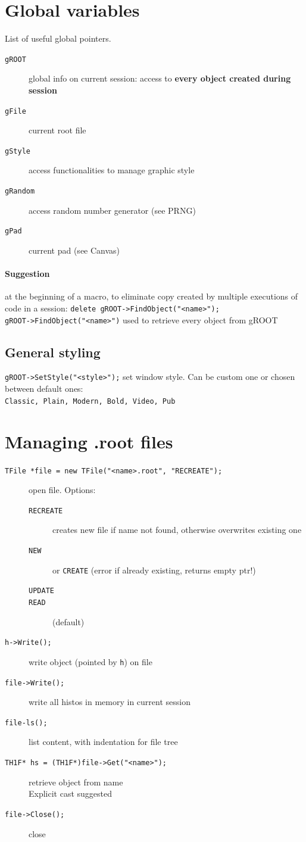 \documentclass[10pt, twoside]{article}
\newcommand{\ttt}[1]{\colorbox{boxgray}{\texttt{#1}}}
\begin{document}
\section{Global variables}
List of useful global pointers.
\begin{description}
\item[\ttt{gROOT}] global info on current session: access to \textbf{every object created during session}
\item[\ttt{gFile}] current root file
\item[\ttt{gStyle}] access functionalities to manage graphic style
\item[\ttt{gRandom}] access random number generator (see PRNG)
\item[\ttt{gPad}] current pad (see Canvas)
\end{description}
\paragraph{Suggestion} at the beginning of a macro, to eliminate copy created by multiple executions of code in a session: \ttt{delete gROOT->FindObject("<name>");}\\
\ttt{gROOT->FindObject("<name>")} used to retrieve every object from gROOT
\subsection*{General styling}
\ttt{gROOT->SetStyle("<style>");} set window style. Can be custom one or chosen between default ones:\\
\ttt{Classic, Plain, Modern, Bold, Video, Pub}

\section{Managing .root files}
\begin{description}
\item[\ttt{TFile *file = new TFile("<name>.root", "RECREATE");}] open file. Options:
\begin{description}
\item[\ttt{RECREATE}] creates new file if name not found, otherwise overwrites existing one
\item[\ttt{NEW}] or \ttt{CREATE} (error if already existing, returns empty ptr!) \item[\ttt{UPDATE}]
\item[\ttt{READ}] (default)
\end{description}
\item[\ttt{h->Write();}] write object (pointed by \ttt{h}) on file
\item[\ttt{file->Write();}] write all histos in memory in current session
\item[\ttt{file-ls();}] list content, with indentation for file tree
\item[\ttt{TH1F* hs = (TH1F*)file->Get("<name>");}] retrieve object from name
\\Explicit cast suggested
\item[\ttt{file->Close();}] close
\end{description}
\end{document}

